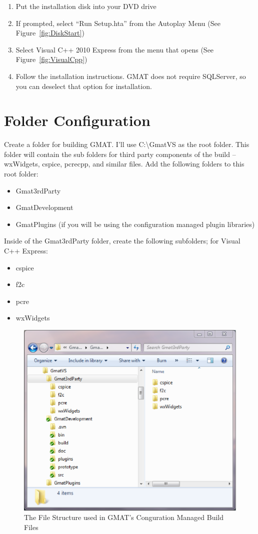 \documentclass[letterpaper,10pt]{article}%
\begin{document}
\begin{enumerate}
\item Put the installation disk into your DVD drive
\item If prompted, select ``Run Setup.hta'' from the Autoplay Menu (See Figure~\ref{fig:DiskStart})
\item Select Visual C++ 2010 Express from the menu that opens (See Figure~\ref{fig:VisualCpp})
\item Follow the installation instructions.  GMAT does not require SQLServer, so you can deselect that option for installation.
\end{enumerate}

\section{Folder Configuration}

Create a folder for building GMAT.  I'll use C:\textbackslash GmatVS as the root folder.  This folder will contain the sub folders for third party components of the build -- wxWidgets, cspice, pcrecpp, and similar files.  Add the following folders to this root folder:
\begin{itemize}
\item Gmat3rdParty
\item GmatDevelopment
\item GmatPlugins (if you will be using the configuration managed plugin libraries)
\end{itemize}

Inside of the Gmat3rdParty folder, create the following subfolders; for Visual C++ Express:
\begin{itemize}
\item cspice
\item f2c
\item pcre
\item wxWidgets
\end{itemize}

\begin{figure}
\centering
\includegraphics{FolderStructure.eps}
\caption{The File Structure used in GMAT's Conguration Managed Build Files}
\label{fig:FolderStructure}
\end{figure}
\end{document}

